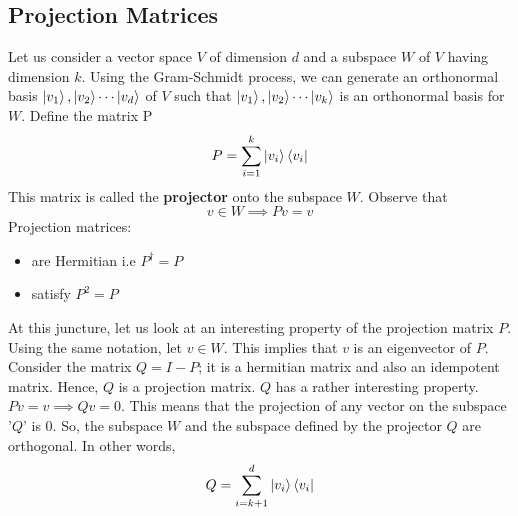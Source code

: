\documentclass{article}
\begin{document}
\cleardoublepage
\subsection{Projection Matrices}
Let us consider a vector space $V$ of dimension $d$ and a subspace $W$ of $V$ having dimension $k$. Using the Gram-Schmidt process, we can generate an orthonormal basis $\ket{v_1}, \ket{v_2} \cdots \ket{v_d}$ of $V$ such that $\ket{v_1}, \ket{v_2} \cdots \ket{v_k}$ is an orthonormal basis for $W$. Define the matrix P $$P = \sum_{i=1}^k \ket{v_i}\bra{v_i}$$
This matrix is called the \textbf{projector} onto the subspace $W$. Observe that $$v \in W \implies Pv = v$$
Projection matrices:
\begin{itemize}
    \item are Hermitian i.e $P^{\dagger} = P$
    \item satisfy $P^2 = P$
\end{itemize}
At this juncture, let us look at an interesting property of the projection matrix $P$. Using the same notation, let $v \in W$. This implies that $v$ is an eigenvector of $P$. Consider the matrix $Q = I-P$; it is a hermitian matrix and also an idempotent matrix. Hence, $Q$ is a projection matrix. $Q$ has a rather interesting property. $Pv = v \implies Qv = 0$. This means that the projection of any vector on the subspace '$Q$' is $0$. So, the subspace $W$ and the subspace defined by the projector $Q$ are orthogonal. In other words, $$Q = \sum_{i=k+1}^d \ket{v_i} \bra{v_i}$$
\end{document}
